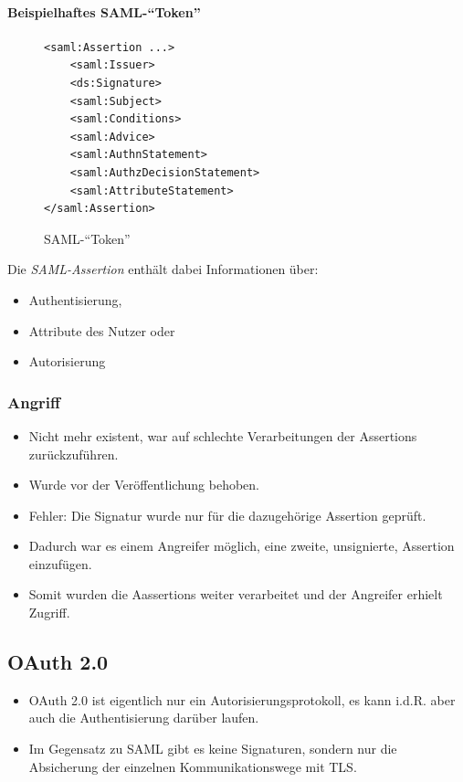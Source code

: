 \documentclass[a4paper, 11pt, accentcolor = tud3b]{tudreport}
\begin{document}
	            \paragraph{Beispielhaftes SAML-\enquote{Token}}
	            \begin{figure}[H]
	            	\centering
	            	\begin{verbatim}
<saml:Assertion ...>
	<saml:Issuer>
	<ds:Signature>
	<saml:Subject>
	<saml:Conditions>
	<saml:Advice>
	<saml:AuthnStatement>
	<saml:AuthzDecisionStatement>
	<saml:AttributeStatement>
</saml:Assertion>
\end{verbatim}
	            	\caption{SAML-\enquote{Token}}
	            \end{figure}
	            Die \textit{SAML-Assertion} enthält dabei Informationen über:
	            \begin{itemize}
	            	\item Authentisierung,
	            	\item Attribute des Nutzer oder
	            	\item Autorisierung
	            \end{itemize}
            
	            \subsubsection{Angriff}
		            \begin{itemize}
		            	\item Nicht mehr existent, war auf schlechte Verarbeitungen der Assertions zurückzuführen.
		            	\item Wurde vor der Veröffentlichung behoben.
		            	\item Fehler: Die Signatur wurde nur für die dazugehörige Assertion geprüft.
		            	\item Dadurch war es einem Angreifer möglich, eine zweite, unsignierte, Assertion einzufügen.
		            	\item Somit wurden die Aassertions weiter verarbeitet und der Angreifer erhielt Zugriff.
		            \end{itemize}

            \subsection{OAuth 2.0}
	            \begin{itemize}
	            	\item OAuth 2.0 ist eigentlich nur ein Autorisierungsprotokoll, es kann i.d.R. aber auch die Authentisierung darüber laufen.
	            	\item Im Gegensatz zu SAML gibt es keine Signaturen, sondern nur die Absicherung der einzelnen Kommunikationswege mit TLS.
	            \end{itemize}
\end{document}
